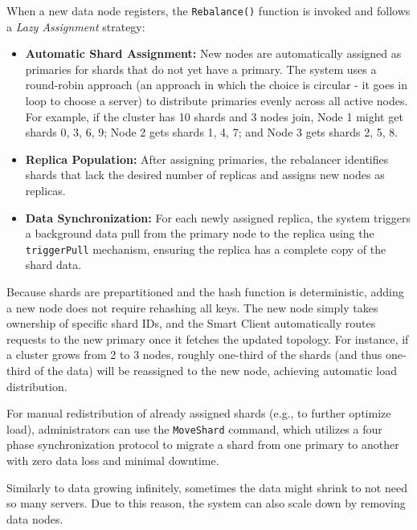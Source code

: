 \documentclass[shortabstract]{iithesis}
\begin{document}
When a new data node registers, the \texttt{Rebalance()} function is invoked and follows a \textit{Lazy Assignment} strategy:
\begin{itemize}
    \item \textbf{Automatic Shard Assignment:} New nodes are automatically assigned as primaries for shards that do not yet have a primary. The system uses a round-robin approach (an approach in which the choice is circular - it goes in loop to choose a server) to distribute primaries evenly across all active nodes. For example, if the cluster has 10 shards and 3 nodes join, Node 1 might get shards 0, 3, 6, 9; Node 2 gets shards 1, 4, 7; and Node 3 gets shards 2, 5, 8.
    \item \textbf{Replica Population:} After assigning primaries, the rebalancer identifies shards that lack the desired number of replicas and assigns new nodes as replicas. 
    \item \textbf{Data Synchronization:} For each newly assigned replica, the system triggers a background data pull from the primary node to the replica using the \texttt{triggerPull} mechanism, ensuring the replica has a complete copy of the shard data.
\end{itemize}

Because shards are prepartitioned and the hash function is deterministic, adding a new node does not require rehashing all keys. The new node simply takes ownership of specific shard IDs, and the Smart Client automatically routes requests to the new primary once it fetches the updated topology. For instance, if a cluster grows from 2 to 3 nodes, roughly one-third of the shards (and thus one-third of the data) will be reassigned to the new node, achieving automatic load distribution.

For manual redistribution of already assigned shards (e.g., to further optimize load), administrators can use the \texttt{MoveShard} command, which utilizes a four phase synchronization protocol to migrate a shard from one primary to another with zero data loss and minimal downtime.

Similarly to data growing infinitely, sometimes the data might shrink to not need so many servers. Due to this reason, the system can also scale down by removing data nodes.
\end{document}
